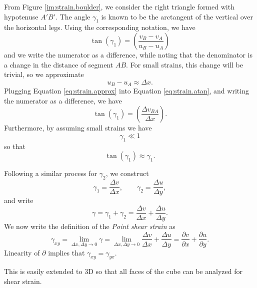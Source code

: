 From Figure \ref{im:strain.boulder}, we consider the right triangle formed with hypotenuse $A'B'$. The angle $\gamma_1$ is known to be the arctangent of the vertical over the horizontal legs. Using the corresponding notation, we have
\begin{equation}
\tan{(\gamma_1)} = \left(\frac{v_B-v_A}{u_B-u_A}\right)
\label{eq:strain.atan}
\end{equation}
and we write the numerator as a difference, while noting that the denominator is a change in the distance of segment $AB$. For small strains, this change will be trivial, so we approximate
\begin{equation}
u_B-u_A\approx\Delta x.
\label{eq:strain.approx}
\end{equation}
Plugging Equation \ref{eq:strain.approx} into Equation \ref{eq:strain.atan}, and writing the numerator as a difference, we have
\begin{equation}
\tan{(\gamma_1)} = \left(\frac{\Delta v_{BA}}{\Delta x}\right).
\end{equation}
Furthermore, by assuming small strains we have
\begin{equation}
\gamma_1\ll1
\end{equation}
so that 
\begin{equation}
\tan{(\gamma_1)}\approx\gamma_1.
\end{equation}

Following a similar process for $\gamma_2$, we construct
\begin{equation}
\gamma_1 = \frac{\Delta v}{\Delta x},\qquad\gamma_2 = \frac{\Delta u}{\Delta y},
\end{equation}
and write
\begin{equation}
\gamma = \gamma_1+\gamma_2 = \frac{\Delta v}{\Delta x}+\frac{\Delta u}{\Delta y}.
\end{equation}
We now write the definition of the \emph{Point shear strain} as
\begin{equation}
\gamma_{xy} = \lim_{\Delta x,\Delta y\to 0}\gamma = \lim_{\Delta x,\Delta y\to 0}\frac{\Delta v}{\Delta x}+\frac{\Delta u}{\Delta y} = \frac{\partial v}{\partial x} + \frac{\partial u}{\partial y}.
\end{equation}
Linearity of $\partial$ implies that $\gamma_{xy}=\gamma_{yx}$.

This is easily extended to 3D so that all faces of the cube can be analyzed for shear strain.

